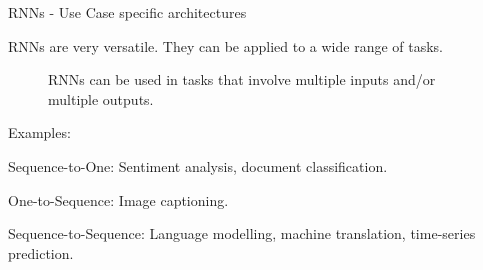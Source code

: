 %
%
%
%
%

\begin{frame} {RNNs - Use Case specific architectures}

  \small{RNNs are very versatile. They can be applied to a wide range of tasks.
  
  \begin{figure}
      \centering
      \caption{\footnotesize {RNNs can be used in tasks that involve multiple inputs and/or multiple outputs. }}
  \end{figure}
  Examples:}
  \begin{itemize}
    \item \small{Sequence-to-One: Sentiment analysis, document classification.
    \item One-to-Sequence: Image captioning.
    \item Sequence-to-Sequence: Language modelling, machine translation, time-series prediction.}
  \end{itemize}
\end{frame}



